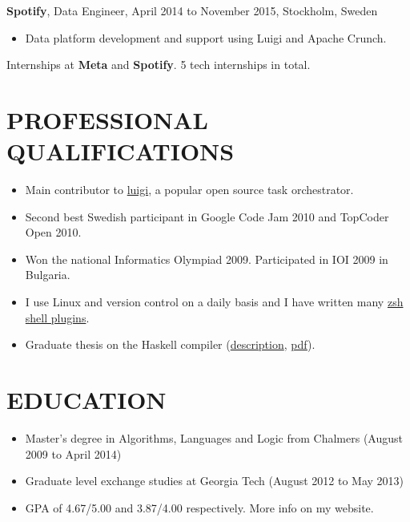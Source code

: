 \documentclass[11pt]{res} %
\begin{document}
\begin{resume}
\textbf{Spotify}, {\footnotesize Data Engineer, April 2014 to November 2015}, Stockholm, Sweden
\vspace{0.2in}
   \begin{itemize}
     \item Data platform development and support using Luigi and Apache Crunch.
 \end{itemize}

Internships at \textbf{Meta} and \textbf{Spotify}. 5 tech internships in total.

\section{PROFESSIONAL QUALIFICATIONS}
   \begin{itemize} %
   \item
     Main contributor to \href{https://github.com/spotify/luigi}{luigi}, a
     popular open source task orchestrator.
   \item Second best Swedish participant in
    Google Code Jam 2010 and TopCoder Open 2010.
   \item Won the national Informatics Olympiad 2009. Participated in IOI 2009 in Bulgaria.
   \item I use Linux and version control 
     on a daily basis and I have written many
     \href{https://github.com/search?q=\%40Tarrasch+zsh+OR+antigen\&type=Repositories\&ref=searchresults}{zsh shell plugins}.
   \item Graduate thesis on the Haskell compiler (\href{https://www.arashrouhani.com/papers.html}{description}, \href{https://www.arashrouhani.com/papers/master-thesis.pdf}{pdf}).
 \end{itemize}

\section{EDUCATION}
 \begin{itemize} %
   \item Master's degree in Algorithms, Languages and Logic from Chalmers
     ({\footnotesize August 2009 to April 2014})
   \item Graduate level exchange studies at Georgia Tech
     ({\footnotesize August 2012 to May 2013})
   \item GPA of 4.67/5.00 and 3.87/4.00 respectively. More info on my website.
 \end{itemize}


\end{resume}
\end{document}
